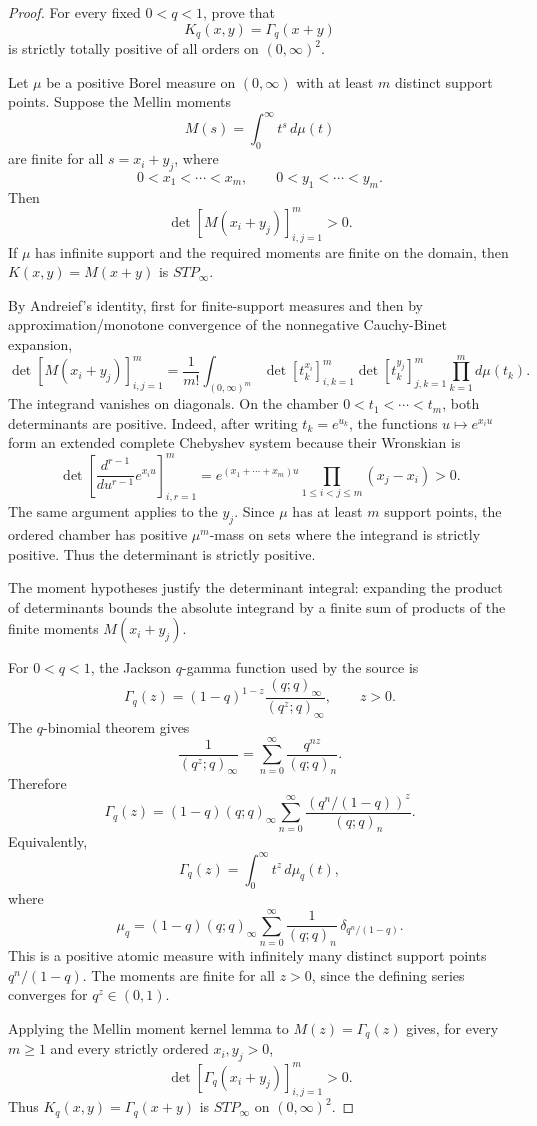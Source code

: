 \documentclass[11pt]{article}
\numberwithin{equation}{section}
\theoremstyle{definition}
\theoremstyle{remark}
\newcommand{\1}{\mathbf 1}
\begin{document}
\begin{proof}
For every fixed \(0<q<1\), prove that
\[
K_q(x,y)=\Gamma_q(x+y)
\]
is strictly totally positive of all orders on \((0,\infty)^2\).

Let \(\mu\) be a positive Borel measure on \((0,\infty)\) with at least \(m\) distinct support points. Suppose the Mellin moments
\[
M(s)=\int_0^\infty t^s\,d\mu(t)
\]
are finite for all \(s=x_i+y_j\), where
\[
0<x_1<\cdots<x_m,\qquad 0<y_1<\cdots<y_m.
\]
Then
\[
\det[M(x_i+y_j)]_{i,j=1}^m>0.
\]
If \(\mu\) has infinite support and the required moments are finite on the domain, then \(K(x,y)=M(x+y)\) is \(STP_\infty\).

By Andreief's identity, first for finite-support measures and then by approximation/monotone convergence of the nonnegative Cauchy-Binet expansion,
\[
\det[M(x_i+y_j)]_{i,j=1}^m
=\frac{1}{m!}\int_{(0,\infty)^m}
\det[t_k^{x_i}]_{i,k=1}^m
\det[t_k^{y_j}]_{j,k=1}^m
\prod_{k=1}^m d\mu(t_k).
\]
The integrand vanishes on diagonals. On the chamber \(0<t_1<\cdots<t_m\), both determinants are positive. Indeed, after writing \(t_k=e^{u_k}\), the functions \(u\mapsto e^{x_i u}\) form an extended complete Chebyshev system because their Wronskian is
\[
\det\left[\frac{d^{r-1}}{du^{r-1}}e^{x_i u}\right]_{i,r=1}^m
=e^{(x_1+\cdots+x_m)u}\prod_{1\le i<j\le m}(x_j-x_i)>0.
\]
The same argument applies to the \(y_j\). Since \(\mu\) has at least \(m\) support points, the ordered chamber has positive \(\mu^m\)-mass on sets where the integrand is strictly positive. Thus the determinant is strictly positive.

The moment hypotheses justify the determinant integral: expanding the product of determinants bounds the absolute integrand by a finite sum of products of the finite moments \(M(x_i+y_j)\).

For \(0<q<1\), the Jackson \(q\)-gamma function used by the source is
\[
\Gamma_q(z)=(1-q)^{1-z}\frac{(q;q)_\infty}{(q^z;q)_\infty},\qquad z>0.
\]
The \(q\)-binomial theorem gives
\[
\frac{1}{(q^z;q)_\infty}=\sum_{n=0}^{\infty}\frac{q^{nz}}{(q;q)_n}.
\]
Therefore
\[
\Gamma_q(z)=(1-q)(q;q)_\infty
\sum_{n=0}^{\infty}\frac{(q^n/(1-q))^z}{(q;q)_n}.
\]
Equivalently,
\[
\Gamma_q(z)=\int_0^\infty t^z\,d\mu_q(t),
\]
where
\[
\mu_q=(1-q)(q;q)_\infty
\sum_{n=0}^{\infty}\frac{1}{(q;q)_n}\,
\delta_{q^n/(1-q)}.
\]
This is a positive atomic measure with infinitely many distinct support points \(q^n/(1-q)\). The moments are finite for all \(z>0\), since the defining series converges for \(q^z\in(0,1)\).

Applying the Mellin moment kernel lemma to \(M(z)=\Gamma_q(z)\) gives, for every \(m\ge1\) and every strictly ordered \(x_i,y_j>0\),
\[
\det[\Gamma_q(x_i+y_j)]_{i,j=1}^m>0.
\]
Thus \(K_q(x,y)=\Gamma_q(x+y)\) is \(STP_\infty\) on \((0,\infty)^2\).
\end{proof}
\end{document}
